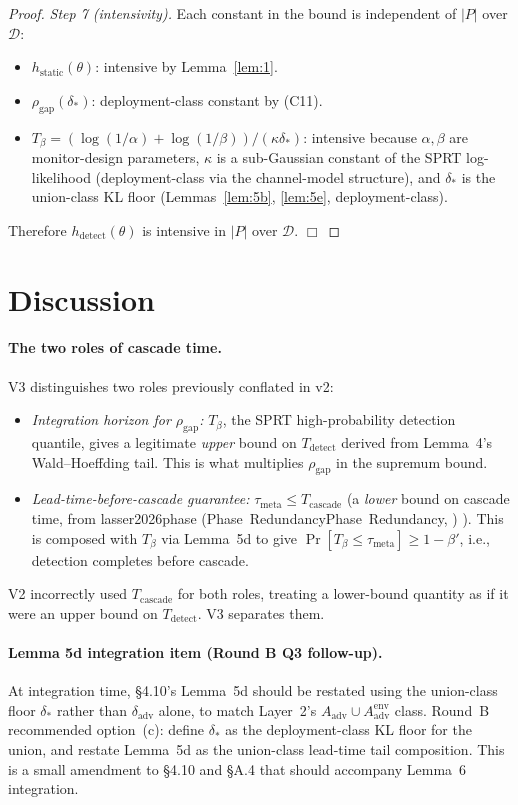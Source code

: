 \documentclass{article}
\makeatletter
\newcommand{\citep}[2][]{%
  \begingroup
  \def\@tmpkey{#2}%
  \ifx\@tmpkey\@empty\else
    (\ifx\@empty#1\@empty\else #1, \fi
     \@nameuse{bibkey@\@tmpkey})%
  \fi
  \endgroup
}
\newcommand{\Aadv}{A_{\mathrm{adv}}}
\newcommand{\deltaadv}{\delta_{\mathrm{adv}}}
\newcommand{\deltastar}{\delta_{*}}
\newcommand{\rhogap}{\rho_{\mathrm{gap}}}
\newcommand{\Tbeta}{T_{\beta}}
\makeatother
\begin{document}
\begin{proof}
\emph{Step 7 (intensivity).}  Each constant in the bound is
independent of $|P|$ over $\mathcal{D}$:
\begin{itemize}
\item $h_{\mathrm{static}}(\theta)$: intensive by Lemma~\ref{lem:1}.
\item $\rhogap(\deltastar)$: deployment-class constant by (C11).
\item $\Tbeta = (\log(1/\alpha) + \log(1/\beta)) /
  (\kappa \deltastar)$: intensive because $\alpha, \beta$ are
  monitor-design parameters, $\kappa$ is a sub-Gaussian constant of
  the SPRT log-likelihood (deployment-class via the channel-model
  structure), and $\deltastar$ is the union-class KL floor
  (Lemmas~\ref{lem:5b}, \ref{lem:5e}, deployment-class).
\end{itemize}
Therefore $h_{\mathrm{detect}}(\theta)$ is intensive in $|P|$ over
$\mathcal{D}$.  $\Box$
\end{proof}

\section{Discussion}

\paragraph{The two roles of cascade time.}
V3 distinguishes two roles previously conflated in v2:

\begin{itemize}
\item \emph{Integration horizon for $\rhogap$:} $\Tbeta$, the SPRT
  high-probability detection quantile, gives a legitimate
  \emph{upper} bound on $T_{\mathrm{detect}}$ derived from
  Lemma~4's Wald--Hoeffding tail.  This is what multiplies
  $\rhogap$ in the supremum bound.
\item \emph{Lead-time-before-cascade guarantee:}
  $\tau_{\mathrm{meta}} \leq T_{\mathrm{cascade}}$ (a \emph{lower}
  bound on cascade time, from
  \citep[Phase~Redundancy]{lasser2026phase}).  This is composed
  with $\Tbeta$ via Lemma~5d to give
  $\Pr[\Tbeta \leq \tau_{\mathrm{meta}}] \geq 1 - \beta'$, i.e.,
  detection completes before cascade.
\end{itemize}

V2 incorrectly used $T_{\mathrm{cascade}}$ for both roles, treating
a lower-bound quantity as if it were an upper bound on
$T_{\mathrm{detect}}$.  V3 separates them.

\paragraph{Lemma 5d integration item (Round B Q3 follow-up).}
At integration time, §4.10's Lemma~5d should be restated using the
union-class floor $\deltastar$ rather than $\deltaadv$ alone, to
match Layer~2's $\Aadv \cup \Aadv^{\mathrm{env}}$ class.  Round~B
recommended option~(c): define $\deltastar$ as the deployment-class
KL floor for the union, and restate Lemma~5d as the union-class
lead-time tail composition.  This is a small amendment to §4.10
and §A.4 that should accompany Lemma~6 integration.
\end{document}
